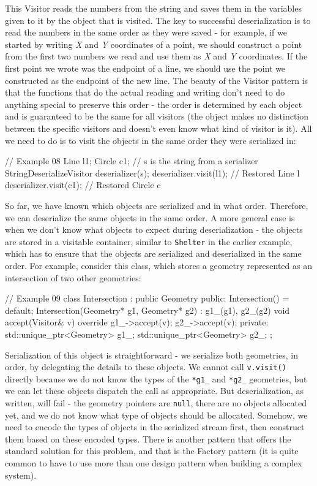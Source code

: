 This Visitor reads the numbers from the string and saves them in the variables given to it by the object that is visited. The key to successful deserialization is to read the numbers in the same order as they were saved - for example, if we started by writing \emph{X} and \emph{Y} coordinates of a point, we should construct a point from the first two numbers we read and use them as \emph{X} and \emph{Y} coordinates. If the first point we wrote was the endpoint of a line, we should use the point we constructed as the endpoint of the new line. The beauty of the Visitor pattern is that the functions that do the actual reading and writing don't need to do anything special to preserve this order - the order is determined by each object and is guaranteed to be the same for all visitors (the object makes no distinction between the specific visitors and doesn't even know what kind of visitor is it). All we need to do is to visit the objects in the same order they were serialized in:

\begin{code}
// Example 08
Line l1;
Circle c1;
// s is the string from a serializer
StringDeserializeVisitor deserializer(s);
deserializer.visit(l1); // Restored Line l
deserializer.visit(c1); // Restored Circle c
\end{code}

So far, we have known which objects are serialized and in what order. Therefore, we can deserialize the same objects in the same order. A more general case is when we don't know what objects to expect during deserialization - the objects are stored in a visitable container, similar to \texttt{Shelter} in the earlier example, which has to ensure that the objects are serialized and deserialized in the same order. For example, consider this class, which stores a geometry represented as an intersection of two other geometries:

\begin{code}
// Example 09
class Intersection : public Geometry {
  public:
  Intersection() = default;
  Intersection(Geometry* g1, Geometry* g2) :
    g1_(g1), g2_(g2) {}
  void accept(Visitor& v) override {
    g1_->accept(v);
    g2_->accept(v);
  }
  private:
  std::unique_ptr<Geometry> g1_;
  std::unique_ptr<Geometry> g2_;
};
\end{code}

Serialization of this object is straightforward - we serialize both geometries, in order, by delegating the details to these objects. We cannot call \texttt{v.visit()} directly because we do not know the types of the \texttt{*g1\_} and \texttt{*g2\_} geometries, but we can let these objects dispatch the call as appropriate. But deserialization, as written, will fail - the geometry pointers are \texttt{null}, there are no objects allocated yet, and we do not know what type of objects should be allocated. Somehow, we need to encode the types of objects in the serialized stream first, then construct them based on these encoded types. There is another pattern that offers the standard solution for this problem, and that is the Factory pattern (it is quite common to have to use more than one design pattern when building a complex system).

